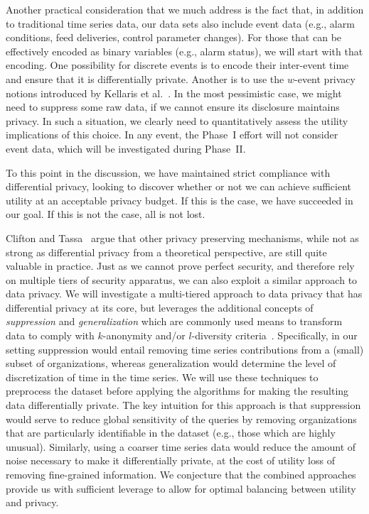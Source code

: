 Another practical consideration that we much address is the fact that, in
addition to traditional time series data, our data sets also include
event data (e.g., alarm conditions, feed deliveries, control parameter
changes).  For those that can be effectively encoded as binary variables
(e.g., alarm status), we will start with that encoding.
One possibility for discrete events is to encode their inter-event time
and ensure that it is differentially private.
Another is to use the $w$-event privacy notions introduced by
Kellaris et al.~\cite{Kellaris14}.
In the most pessimistic case, we might need to suppress some raw data,
if we cannot ensure its disclosure maintains privacy.  In such a situation,
we clearly need to quantitatively assess the utility implications
of this choice.
In any event, the Phase~I effort will not consider event data, which will
be investigated during Phase~II. 

To this point in the discussion, we have maintained strict compliance
with differential privacy, looking to discover whether or not we can
achieve sufficient utility at an acceptable privacy budget.  If this is
the case, we have succeeded in our goal.  If this is not the case, all
is not lost.

Clifton and Tassa~\cite{ct13} argue that other privacy preserving
mechanisms, while not as strong as differential privacy from a
theoretical perspective, are still quite valuable in practice.
Just as we cannot prove perfect security, and therefore rely on multiple
tiers of security apparatus, we can also exploit a similar approach
to data privacy.  
We will investigate a multi-tiered approach to data
privacy that has differential privacy at its core, but leverages the
additional concepts of \emph{suppression} and \emph{generalization}
which are commonly used means to transform data to comply with
$k$-anonymity and/or $l$-diversity criteria~\cite{mkgv07}.
Specifically, in our setting suppression would entail removing time
series contributions from a (small) subset of organizations, whereas
generalization would determine the level of discretization of time in
the time series.
We will use these techniques to preprocess the dataset
before applying the algorithms for making the resulting data
differentially private.
The key intuition for this approach is that suppression would serve to
reduce global sensitivity of the queries by removing organizations that are
particularly identifiable in the dataset (e.g., those which are highly
unusual).
Similarly, using a coarser time series data would reduce the amount of
noise necessary to make it differentially private, at the cost of utility loss
of removing fine-grained information.
We conjecture that the combined approaches provide us with sufficient
leverage to allow for optimal balancing between utility and privacy.


